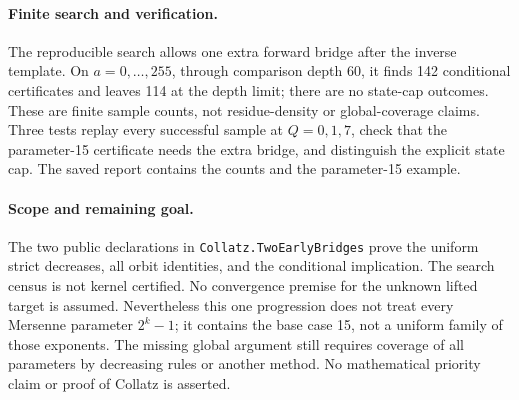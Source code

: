 \documentclass[10pt]{article}
\begin{document}
\paragraph{Finite search and verification.}
The reproducible search allows one extra forward bridge after the inverse
template. On $a=0,\ldots,255$, through comparison depth 60, it finds
142 conditional certificates and leaves 114 at the depth limit; there are
no state-cap outcomes. These are finite sample counts, not residue-density
or global-coverage claims. Three tests replay every successful sample at
$Q=0,1,7$, check that the parameter-15 certificate needs the extra bridge,
and distinguish the explicit state cap. The saved report contains the
counts and the parameter-15 example.

\paragraph{Scope and remaining goal.}
The two public declarations in \texttt{Collatz.TwoEarlyBridges} prove the
uniform strict decreases, all orbit identities, and the conditional implication.
The search census is not kernel certified. No convergence premise for the
unknown lifted target is assumed. Nevertheless this one progression does
not treat every Mersenne parameter $2^k-1$; it contains the base case 15,
not a uniform family of those exponents. The missing global argument still
requires coverage of all parameters by decreasing rules or another method.
No mathematical priority claim or proof of Collatz is asserted.
\end{document}
